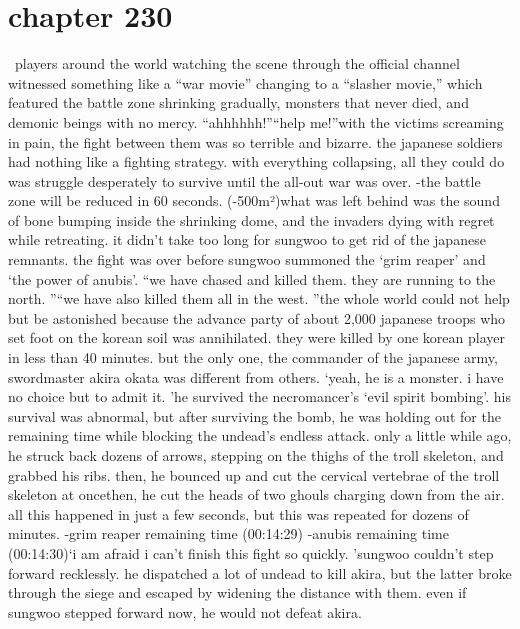 \section{chapter 230}






 players around the world watching the scene through the official channel witnessed something like a “war movie” changing to a “slasher movie,” which featured the battle zone shrinking gradually, monsters that never died, and demonic beings with no mercy.
“ahhhhhh!”“help me!”with the victims screaming in pain, the fight between them was so terrible and bizarre.
the japanese soldiers had nothing like a fighting strategy.
 with everything collapsing, all they could do was struggle desperately to survive until the all-out war was over.
-the battle zone will be reduced in 60 seconds.
 (-500m²)what was left behind was the sound of bone bumping inside the shrinking dome, and the invaders dying with regret while retreating.
it didn’t take too long for sungwoo to get rid of the japanese remnants.
 the fight was over before sungwoo summoned the ‘grim reaper’ and ‘the power of anubis’.
“we have chased and killed them.
 they are running to the north.
”“we have also killed them all in the west.
”the whole world could not help but be astonished because the advance party of about 2,000 japanese troops who set foot on the korean soil was annihilated.
 they were killed by one korean player in less than 40 minutes.
but the only one, the commander of the japanese army, swordmaster akira okata was different from others.
‘yeah, he is a monster.
 i have no choice but to admit it.
’he survived the necromancer’s ‘evil spirit bombing’.
 his survival was abnormal, but after surviving the bomb, he was holding out for the remaining time while blocking the undead’s endless attack.
only a little while ago, he struck back dozens of arrows, stepping on the thighs of the troll skeleton, and grabbed his ribs.
 then, he bounced up and cut the cervical vertebrae of the troll skeleton at oncethen, he cut the heads of two ghouls charging down from the air.
all this happened in just a few seconds, but this was repeated for dozens of minutes.
-grim reaper remaining time (00:14:29)
-anubis remaining time (00:14:30)‘i am afraid i can’t finish this fight so quickly.
’sungwoo couldn’t step forward recklessly.
 he dispatched a lot of undead to kill akira, but the latter broke through the siege and escaped by widening the distance with them.
even if sungwoo stepped forward now, he would not defeat akira.
